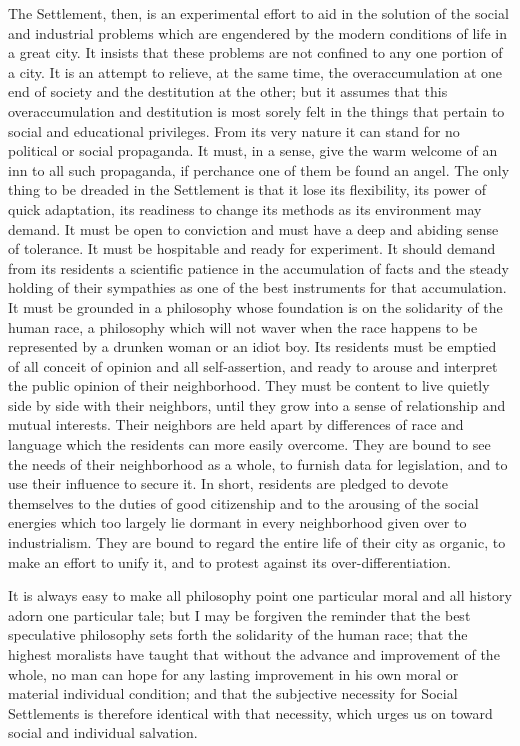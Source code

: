 The Settlement, then, is an experimental effort to aid in the solution
of the social and industrial problems which are engendered by the
modern conditions of life in a great city. It insists that these
problems are not confined to any one portion of a city. It is an
attempt to relieve, at the same time, the overaccumulation at
 one end of society and the destitution at the other; but it
assumes that this overaccumulation and destitution is most sorely felt
in the things that pertain to social and educational privileges. From
its very nature it can stand for no political or social propaganda. It
must, in a sense, give the warm welcome of an inn to all such
propaganda, if perchance one of them be found an angel. The only thing
to be dreaded in the Settlement is that it lose its flexibility, its
power of quick adaptation, its readiness to change its methods as its
environment may demand. It must be open to conviction and must have a
deep and abiding sense of tolerance. It must be hospitable and ready
for experiment. It should demand from its residents a scientific
patience in the accumulation of facts and the steady holding of their
sympathies as one of the best instruments for that accumulation. It
must be grounded in a philosophy whose foundation is on the solidarity
of the human race, a philosophy which will not waver when the race
happens to be represented by a drunken woman or an idiot boy. Its
residents must be emptied of all conceit of opinion and all
self-assertion, and ready to arouse and interpret the public opinion
of their neighborhood. They must be content to live quietly side by
side with their neighbors, until they grow into a sense of
relationship and mutual interests. Their neighbors are held apart by
differences of race and language which the residents can more easily
overcome. They are bound to see the needs of their neighborhood as a
whole, to furnish data for legislation, and to use their influence to
secure it. In short, residents are pledged to devote themselves to the
duties of good citizenship and to the arousing of the social energies
 which too largely lie dormant in every neighborhood given
over to industrialism. They are bound to regard the entire life of
their city as organic, to make an effort to unify it, and to protest
against its over-differentiation.

It is always easy to make all philosophy point one particular moral
and all history adorn one particular tale; but I may be forgiven the
reminder that the best speculative philosophy sets forth the
solidarity of the human race; that the highest moralists have taught
that without the advance and improvement of the whole, no man can hope
for any lasting improvement in his own moral or material individual
condition; and that the subjective necessity for Social Settlements is
therefore identical with that necessity, which urges us on toward
social and individual salvation.

